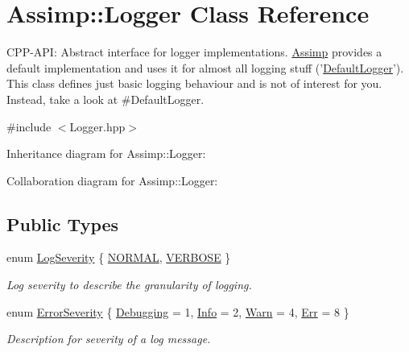 \hypertarget{class_assimp_1_1_logger}{\section{Assimp\-:\-:Logger Class Reference}
\label{class_assimp_1_1_logger}
}


C\-P\-P-\/\-A\-P\-I\-: Abstract interface for logger implementations. \hyperlink{namespace_assimp}{Assimp} provides a default implementation and uses it for almost all logging stuff ('\hyperlink{class_assimp_1_1_default_logger}{Default\-Logger}'). This class defines just basic logging behaviour and is not of interest for you. Instead, take a look at \#\-Default\-Logger.  




{\ttfamily \#include $<$Logger.\-hpp$>$}



Inheritance diagram for Assimp\-:\-:Logger\-:


Collaboration diagram for Assimp\-:\-:Logger\-:
\subsection*{Public Types}
\begin{DoxyCompactItemize}
\item 
enum \hyperlink{class_assimp_1_1_logger_a8b6248a0fd062431e8572556350d29e6}{Log\-Severity} \{ \hyperlink{class_assimp_1_1_logger_a8b6248a0fd062431e8572556350d29e6a79d16f85dc21486ee489f300027e8eda}{N\-O\-R\-M\-A\-L}, 
\hyperlink{class_assimp_1_1_logger_a8b6248a0fd062431e8572556350d29e6afc9d1d86aa82fdb80e00c99b3c1ce486}{V\-E\-R\-B\-O\-S\-E}
 \}
\begin{DoxyCompactList}\small\item\em Log severity to describe the granularity of logging. \end{DoxyCompactList}\item 
enum \hyperlink{class_assimp_1_1_logger_acd0b52a87d6fc11e957ed2c6e2ad75b6}{Error\-Severity} \{ \hyperlink{class_assimp_1_1_logger_acd0b52a87d6fc11e957ed2c6e2ad75b6a0cb475014d27098c3423738c571d857f}{Debugging} = 1, 
\hyperlink{class_assimp_1_1_logger_acd0b52a87d6fc11e957ed2c6e2ad75b6aa3377a574928b86f7de55c5df154f461}{Info} = 2, 
\hyperlink{class_assimp_1_1_logger_acd0b52a87d6fc11e957ed2c6e2ad75b6a1279c77aaee5a3d7df835a9b9305a697}{Warn} = 4, 
\hyperlink{class_assimp_1_1_logger_acd0b52a87d6fc11e957ed2c6e2ad75b6a71054d0b1323abcea46d050d69013d27}{Err} = 8
 \}
\begin{DoxyCompactList}\small\item\em Description for severity of a log message. \end{DoxyCompactList}\end{DoxyCompactItemize}
